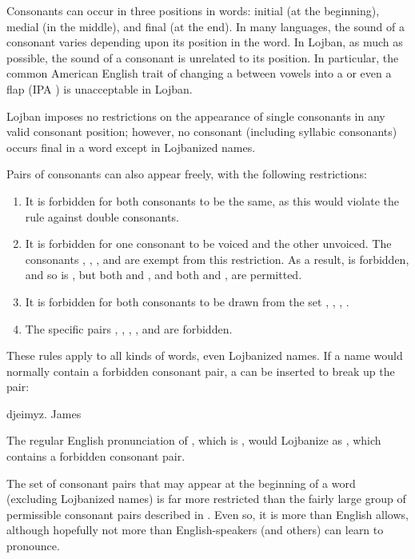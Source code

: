 Consonants can occur in three positions in words: initial (at the beginning), medial (in the middle), and final (at the end). In many languages, the sound of a consonant varies depending upon its position in the word. In Lojban, as much as possible, the sound of a consonant is unrelated to its position. In particular, the common American English trait of changing a  between vowels into a  or even a flap (IPA ) is unacceptable in Lojban.

Lojban imposes no restrictions on the appearance of single consonants in any valid consonant position; however, no consonant (including syllabic consonants) occurs final in a word except in Lojbanized names.

Pairs of consonants can also appear freely, with the following restrictions:

\begin{enumerate}
\item It is forbidden for both consonants to be the same, as this would violate the rule against double consonants.
\item It is forbidden for one consonant to be voiced and the other unvoiced. The consonants , , , and  are exempt from this restriction. As a result,  is forbidden, and so is , but both  and , and both  and , are permitted.
\item It is forbidden for both consonants to be drawn from the set , , , .
\item The specific pairs , , , , and  are forbidden.
\end{enumerate}

These rules apply to all kinds of words, even Lojbanized names. If a name would normally contain a forbidden consonant pair, a  can be inserted to break up the pair:
\begin{example}
djeimyz.\n
{}\n
James
\end{example}

The regular English pronunciation of , which is , would Lojbanize as , which contains a forbidden consonant pair.



The set of consonant pairs that may appear at the beginning of a word (excluding Lojbanized names) is far more restricted than the fairly large group of permissible consonant pairs described in . Even so, it is more than English allows, although hopefully not more than English-speakers (and others) can learn to pronounce.

